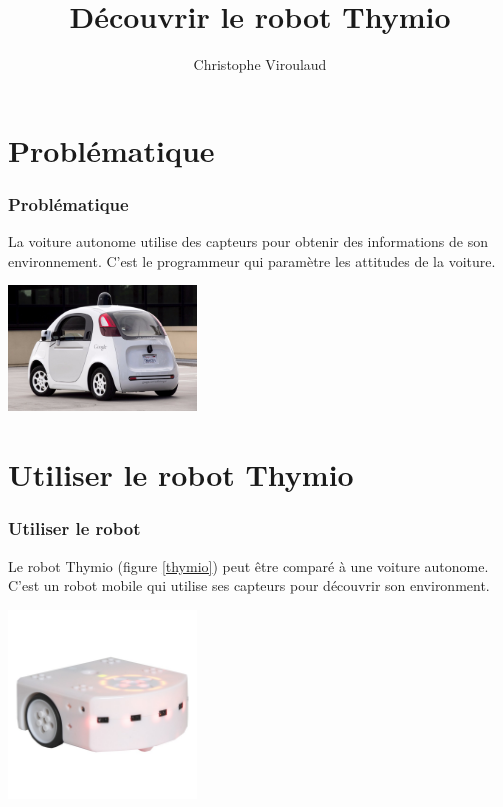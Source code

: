 \documentclass[svgnames,11pt]{beamer}
\author[]{Christophe Viroulaud}
\title{Découvrir le robot Thymio}
\date{}
\institute{Seconde SNT}
\begin{document}
\begin{frame}
\titlepage
\end{frame}

\section{Problématique}
\begin{frame}
    \frametitle{Problématique}

    La voiture autonome utilise des capteurs pour obtenir des informations de son environnement.  C'est le programmeur qui paramètre les attitudes de la voiture.
    \begin{center}
    \centering
    \includegraphics[width=5cm]{ressources/voiture.jpg}
    \end{center}
\begin{center}
\end{center}
\end{frame}

\section{Utiliser le robot Thymio}
\begin{frame}
    \frametitle{Utiliser le robot}

    Le robot Thymio (figure \ref{thymio}) peut être comparé à une voiture autonome. C'est un robot mobile qui utilise ses capteurs pour découvrir son environment.
\begin{center}
\centering
\includegraphics[width=5cm]{ressources/robot-thymio.jpg}
\label{thymio}
\end{center}

\end{frame}
\end{document}
